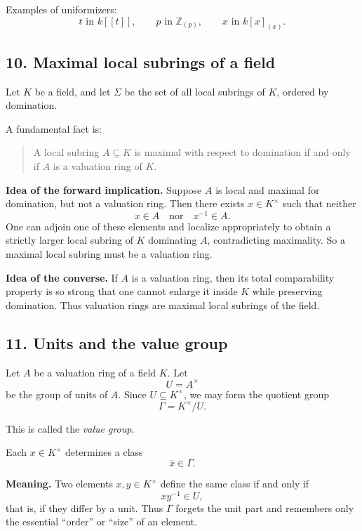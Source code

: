 \documentclass[12pt,a4paper]{article}
\theoremstyle{notespace}
\begin{document}
Examples of uniformizers:
\[
t \text{ in } k[[t]], \qquad p \text{ in } \mathbb Z_{(p)}, \qquad x \text{ in } k[x]_{(x)}.
\]

\subsection*{10. Maximal local subrings of a field}

Let \(K\) be a field, and let \(\Sigma\) be the set of all local subrings of \(K\), ordered by domination.

A fundamental fact is:

\begin{quote}
	A local subring \(A\subseteq K\) is maximal with respect to domination if and only if \(A\) is a valuation ring of \(K\).
\end{quote}

\textbf{Idea of the forward implication.}
Suppose \(A\) is local and maximal for domination, but not a valuation ring. Then there exists \(x\in K^\times\) such that neither
\[
x\in A \quad \text{nor} \quad x^{-1}\in A.
\]
One can adjoin one of these elements and localize appropriately to obtain a strictly larger local subring of \(K\) dominating \(A\), contradicting maximality. So a maximal local subring must be a valuation ring.

\textbf{Idea of the converse.}
If \(A\) is a valuation ring, then its total comparability property is so strong that one cannot enlarge it inside \(K\) while preserving domination. Thus valuation rings are maximal local subrings of the field.

\subsection*{11. Units and the value group}

Let \(A\) be a valuation ring of a field \(K\). Let
\[
U=A^\times
\]
be the group of units of \(A\). Since \(U\subseteq K^\times\), we may form the quotient group
\[
\Gamma = K^\times/U.
\]

This is called the \emph{value group}.

Each \(x\in K^\times\) determines a class
\[
\overline{x}\in \Gamma.
\]

\textbf{Meaning.}
Two elements \(x,y\in K^\times\) define the same class if and only if
\[
xy^{-1}\in U,
\]
that is, if they differ by a unit. Thus \(\Gamma\) forgets the unit part and remembers only the essential ``order'' or ``size'' of an element.
\end{document}
